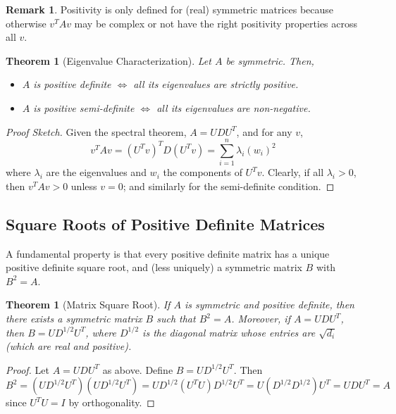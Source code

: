 \documentclass[11pt]{article}
\theoremstyle{definition}
\theoremstyle{plain}
\newtheorem{theorem}[definition]{Theorem}
\theoremstyle{definition}
\newtheorem{remark}[definition]{Remark}
\begin{document}
\begin{remark}
Positivity is only defined for (real) symmetric matrices because otherwise $v^T A v$ may be complex or not have the right positivity properties across all $v$.
\end{remark}

\begin{theorem}[Eigenvalue Characterization]
Let $A$ be symmetric. Then,
\begin{itemize}
    \item $A$ is positive definite $\iff$ all its eigenvalues are strictly positive.
    \item $A$ is positive semi-definite $\iff$ all its eigenvalues are non-negative.
\end{itemize}
\end{theorem}

\begin{proof}[Proof Sketch]
Given the spectral theorem, $A = U D U^T$, and for any $v$,
\[
v^T A v = (U^T v)^T D (U^T v) = \sum_{i=1}^n \lambda_i (w_i)^2
\]
where $\lambda_i$ are the eigenvalues and $w_i$ the components of $U^T v$. Clearly, if all $\lambda_i > 0$, then $v^T A v > 0$ unless $v=0$; and similarly for the semi-definite condition.
\end{proof}

\subsection{Square Roots of Positive Definite Matrices}

A fundamental property is that every positive definite matrix has a unique positive definite square root, and (less uniquely) a symmetric matrix $B$ with $B^2 = A$.

\begin{theorem}[Matrix Square Root]
If $A$ is symmetric and positive definite, then there exists a symmetric matrix $B$ such that $B^2 = A$. Moreover, if $A = U D U^T$, then $B = U D^{1/2} U^T$, where $D^{1/2}$ is the diagonal matrix whose entries are $\sqrt{d_i}$ (which are real and positive).
\end{theorem}

\begin{proof}
Let $A = U D U^T$ as above. Define $B = U D^{1/2} U^T$. Then
\[
B^2 = (U D^{1/2} U^T)(U D^{1/2} U^T) = U D^{1/2} (U^T U) D^{1/2} U^T = U (D^{1/2} D^{1/2}) U^T = U D U^T = A
\]
since $U^T U = I$ by orthogonality.
\end{proof}
\end{document}
